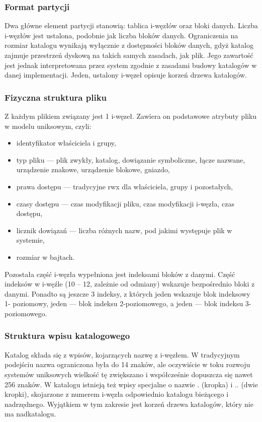 \documentclass[main.tex]{subfiles}
\begin{document}
    \subsubsection{Format partycji}
    Dwa główne element partycji stanowią: tablica i-węzłów oraz bloki danych. Liczba i-węzłów jest ustalona, podobnie jak liczba bloków danych. Ograniczenia na rozmiar katalogu wynikają wyłącznie z dostępności bloków danych, gdyż katalog zajmuje przestrzeń dyskową na takich samych
    zasadach, jak plik. Jego zawartość jest jednak interpretowana przez system zgodnie z zasadami budowy katalogów w danej
    implementacji. Jeden, ustalony i-węzeł opisuje korzeń drzewa katalogów.

    \subsubsection{Fizyczna struktura pliku}
    Z każdym plikiem związany jest 1 i-węzeł. Zawiera
    on podstawowe atrybuty pliku w modelu
    uniksowym, czyli:
    \begin{itemize}
        \item identyfikator właściciela i grupy,
        \item typ pliku — plik zwykły, katalog, dowiązanie
        symboliczne, łącze nazwane, urządzenie znakowe,
        urządzenie blokowe, gniazdo,
        \item prawa dostępu — tradycyjne rwx dla właściciela,
        grupy i pozostałych,
        \item czasy dostępu — czas modyfikacji pliku, czas
        modyfikacji i-węzła, czas dostępu,
        \item licznik dowiązań — liczba różnych nazw, pod
        jakimi występuje plik w systemie,
        \item rozmiar w bajtach.
    \end{itemize}

    Pozostała część i-węzła wypełniona jest indeksami
    bloków z danymi. Część indeksów w i-węźle (10 –
    12, zależnie od odmiany) wskazuje bezpośrednio
    bloki z danymi. Ponadto są jeszcze 3 indeksy, z
    których jeden wskazuje blok indeksowy 1-
    poziomowy, jeden — blok indeksu 2-poziomowego,
    a jeden — blok indeksu 3-poziomowego.

    \subsubsection{Struktura wpisu katalogowego}
    Katalog składa się z wpisów, kojarzących nazwę z i-węzłem. W tradycyjnym podejściu nazwa
    ograniczona była do 14 znaków, ale oczywiście w toku rozwoju systemów uniksowych
    wielkość tę zwiększano i współcześnie dopuszcza się nawet 256 znaków. W katalogu istnieją
    też wpisy specjalne o nazwie . (kropka) i .. (dwie kropki), skojarzone z numerem i-węzła
    odpowiednio katalogu bieżącego i nadrzędnego. Wyjątkiem w tym zakresie jest korzeń drzewa
    katalogów, który nie ma nadkatalogu.
\end{document}
